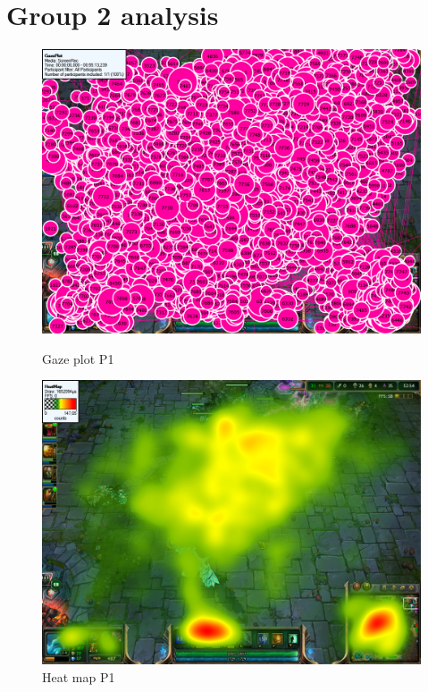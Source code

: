 \documentclass[notitlepage]{report}
\begin{document}
\section{Group 2 analysis}

\begin{figure}[ht]
\begin{minipage}[b]{0.45\linewidth}
\centering
\includegraphics[width=\textwidth]{images/gazeplot/Emelie}
\caption{Gaze plot P1}
\label{gaze_eme}
\end{minipage}
\hspace{0.5cm}
\begin{minipage}[b]{0.45\linewidth}
\centering
\includegraphics[width=\textwidth]{images/heatmap/Emelie}
\caption{Heat map P1}
\label{heat_eme}
\end{minipage}
\end{figure}
\end{document}
